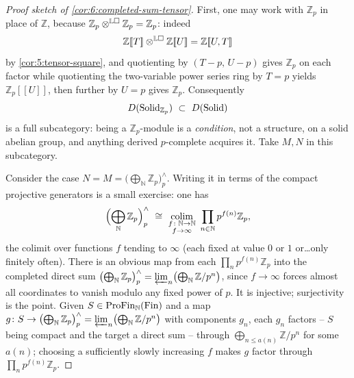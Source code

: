 \begin{proof}[Proof sketch of \cref{cor:6:completed-sum-tensor}]
First, one may work with $\mathbb{Z}_p$ in place of $\mathbb{Z}$, because
$\mathbb{Z}_p\otimes^{\mathbb{L}\square}\mathbb{Z}_p=\mathbb{Z}_p$: indeed
\begin{equation*}
\mathbb{Z}[\![T]\!]\otimes^{\mathbb{L}\square}\mathbb{Z}[\![U]\!]
=\mathbb{Z}[\![U,T]\!]
\end{equation*}
by \cref{cor:5:tensor-square}, and quotienting by $(T-p,\,U-p)$ gives
$\mathbb{Z}_p$ on each factor while quotienting the two-variable power series ring
by $T=p$ yields $\mathbb{Z}_p[\![U]\!]$, then further by $U=p$ gives $\mathbb{Z}_p$.
Consequently
\begin{equation*}
D(\Solid_{\mathbb{Z}_p})\ \subset\ D(\Solid)
\end{equation*}
is a full subcategory: being a $\mathbb{Z}_p$-module is a \emph{condition}, not a
structure, on a solid abelian group, and anything derived $p$-complete acquires
it. Take $M,N$ in this subcategory.

Consider the case $N=M=\bigl(\bigoplus_{\mathbb{N}}\mathbb{Z}_p\bigr)^{\wedge}_{p}$.
Writing it in terms of the compact projective generators is a small exercise: one
has
\begin{equation*}
\Bigl(\bigoplus_{\mathbb{N}}\mathbb{Z}_p\Bigr)^{\wedge}_{p}\ \cong\
\operatorname*{colim}_{\substack{f\colon\mathbb{N}\to\mathbb{N}\\ f\to\infty}}\
\prod_{n\in\mathbb{N}}p^{f(n)}\mathbb{Z}_p ,
\end{equation*}
the colimit over functions $f$ tending to $\infty$ (each fixed at value $0$ or
$1$ or\ldots only finitely often). There is an obvious map from each
$\prod_{n}p^{f(n)}\mathbb{Z}_p$ into the completed direct sum
$\bigl(\bigoplus_{\mathbb{N}}\mathbb{Z}_p\bigr)^{\wedge}_{p}
=\varprojlim_{n}\bigl(\bigoplus_{\mathbb{N}}\mathbb{Z}/p^{n}\bigr)$, since
$f\to\infty$ forces almost all coordinates to vanish modulo any fixed power of
$p$. It is injective; surjectivity is the point. Given
$S\in\mathrm{ProFin}_{\mathbb{N}}(\mathrm{Fin})$ and a map
$g\colon S\to\bigl(\bigoplus_{\mathbb{N}}\mathbb{Z}_p\bigr)^{\wedge}_{p}
=\varprojlim_{n}\bigl(\bigoplus_{\mathbb{N}}\mathbb{Z}/p^{n}\bigr)$ with components
$g_n$, each $g_n$ factors -- $S$ being compact and the target a direct sum --
through $\bigoplus_{n\leq a(n)}\mathbb{Z}/p^{n}$ for some $a(n)$; choosing a
sufficiently slowly increasing $f$ makes $g$ factor through
$\prod_{n}p^{f(n)}\mathbb{Z}_p$.


\end{proof}
